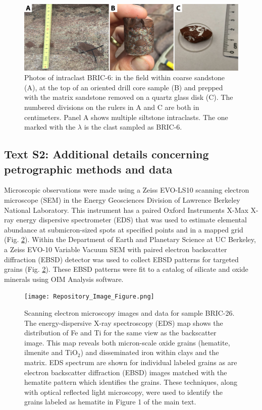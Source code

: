 \documentclass[11pt,letterpaper]{article}
\begin{document}
\begin{figure}[!ht]
\noindent\includegraphics[width=\textwidth]{prep_figure.jpg}
\caption{\small{Photos of intraclast BRIC-6: in the field within coarse sandstone (A), at the top of an oriented drill core sample (B) and prepped with the matrix sandstone removed on a quartz glass disk (C). The numbered divisions on the rulers in A and C are both in centimeters. Panel A shows multiple siltstone intraclasts. The one marked with the $\lambda$ is the clast sampled as BRIC-6.}}
\label{fig:prep_figure}
\end{figure} 

\subsection*{Text S2: Additional details concerning petrographic methods and data}
Microscopic observations were made using a Zeiss EVO-LS10 scanning electron microscope (SEM) in the Energy Geosciences Division of Lawrence Berkeley National Laboratory. This instrument has a paired Oxford Instruments X-Max X-ray energy dispersive spectrometer (EDS) that was used to estimate elemental abundance at submicron-sized spots at specified points and in a mapped grid (Fig. \ref{fig:sem_images}). Within the Department of Earth and Planetary Science at UC Berkeley, a Zeiss EVO-10 Variable Vacuum SEM with paired electron backscatter diffraction (EBSD) detector was used to collect EBSD patterns for targeted grains (Fig. \ref{fig:sem_images}). These EBSD patterns were fit to a catalog of silicate and oxide minerals using OIM Analysis software.

\begin{figure}[!ht]
\centering
\noindent\texttt{[image: Repository\_Image\_Figure.png]}
\caption{\small{Scanning electron microscopy images and data for sample BRIC-26. The energy-dispersive X-ray spectroscopy (EDS) map shows the distribution of Fe and Ti for the same view as the backscatter image. This map reveals both micron-scale oxide grains (hematite, ilmenite and TiO$_2$) and disseminated iron within clays and the matrix. EDS spectrum are shown for individual labeled grains as are electron backscatter diffraction (EBSD) images matched with the hematite pattern which identifies the grains. These techniques, along with optical reflected light microscopy, were used to identify the grains labeled as hematite in Figure 1 of the main text.}}
\label{fig:sem_images}
\end{figure} 
\end{document}
